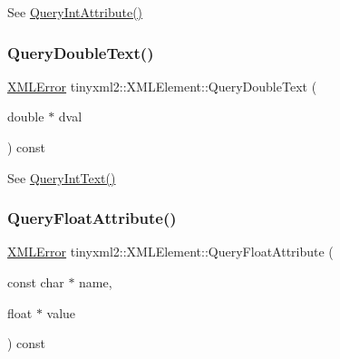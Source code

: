 See \mbox{\hyperlink{classtinyxml2_1_1_x_m_l_element_a8a78bc1187c1c45ad89f2690eab567b1}{Query\+Int\+Attribute()}} 

\mbox{\label{classtinyxml2_1_1_x_m_l_element_a684679c99bb036a25652744cec6c4d96}} 
\subsubsection{\texorpdfstring{Query\+Double\+Text()}{QueryDoubleText()}}
{\footnotesize\ttfamily \mbox{\hyperlink{namespacetinyxml2_a1fbf88509c3ac88c09117b1947414e08}{X\+M\+L\+Error}} tinyxml2\+::\+X\+M\+L\+Element\+::\+Query\+Double\+Text (\begin{DoxyParamCaption}\item[{double $\ast$}]{dval }\end{DoxyParamCaption}) const}



See \mbox{\hyperlink{classtinyxml2_1_1_x_m_l_element_a926357996bef633cb736e1a558419632}{Query\+Int\+Text()}} 

\mbox{\label{classtinyxml2_1_1_x_m_l_element_acd5eeddf6002ef90806af794b9d9a5a5}} 
\subsubsection{\texorpdfstring{Query\+Float\+Attribute()}{QueryFloatAttribute()}}
{\footnotesize\ttfamily \mbox{\hyperlink{namespacetinyxml2_a1fbf88509c3ac88c09117b1947414e08}{X\+M\+L\+Error}} tinyxml2\+::\+X\+M\+L\+Element\+::\+Query\+Float\+Attribute (\begin{DoxyParamCaption}\item[{const char $\ast$}]{name,  }\item[{float $\ast$}]{value }\end{DoxyParamCaption}) const\hspace{0.3cm}{\ttfamily [inline]}}



